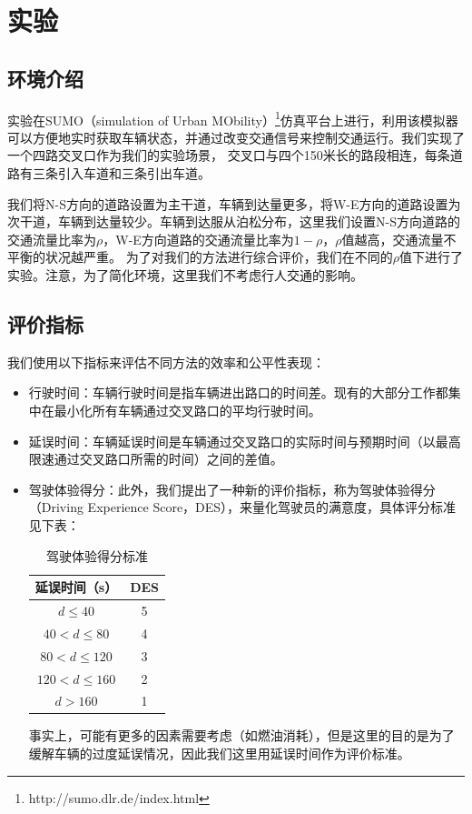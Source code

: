 \section{实验}
\subsection{环境介绍}
实验在SUMO（simulation of Urban MObility）\footnote{http://sumo.dlr.de/index.html}仿真平台上进行，利用该模拟器可以方便地实时获取车辆状态，并通过改变交通信号来控制交通运行。我们实现了一个四路交叉口作为我们的实验场景，
交叉口与四个150米长的路段相连，每条道路有三条引入车道和三条引出车道。

我们将N-S方向的道路设置为主干道，车辆到达量更多，将W-E方向的道路设置为次干道，车辆到达量较少。车辆到达服从泊松分布，这里我们设置N-S方向道路的交通流量比率为$\rho$，W-E方向道路的交通流量比率为$1-\rho$，$\rho$值越高，交通流量不平衡的状况越严重。
为了对我们的方法进行综合评价，我们在不同的$\rho$值下进行了实验。注意，为了简化环境，这里我们不考虑行人交通的影响。

\subsection{评价指标}
我们使用以下指标来评估不同方法的效率和公平性表现：
\begin{itemize}
    \item 行驶时间：车辆行驶时间是指车辆进出路口的时间差。现有的大部分工作都集中在最小化所有车辆通过交叉路口的平均行驶时间。
    \item 延误时间：车辆延误时间是车辆通过交叉路口的实际时间与预期时间（以最高限速通过交叉路口所需的时间）之间的差值。
    \item 驾驶体验得分：此外，我们提出了一种新的评价指标，称为驾驶体验得分（Driving Experience Score，DES），来量化驾驶员的满意度，具体评分标准见下表：
        \begin{table}[htb]
            \caption{驾驶体验得分标准}
            \begin{tabular}{cc}
            \toprule
            延误时间（s） & DES \\
            \midrule
            $d \leq 40$ & 5\\
            $40 < d \leq 80$ & 4 \\
            $80 < d \leq 120$ & 3 \\
            $120 < d \leq 160$ & 2 \\
            $d > 160$ & 1 \\ 
            \bottomrule
            \end{tabular}
        \end{table}
        事实上，可能有更多的因素需要考虑（如燃油消耗），但是这里的目的是为了缓解车辆的过度延误情况，因此我们这里用延误时间作为评价标准。
\end{itemize}
